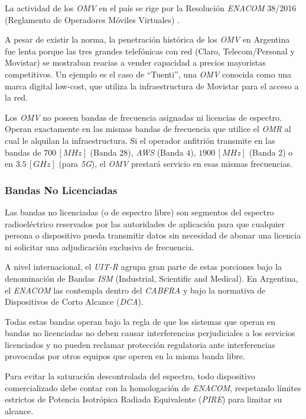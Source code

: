 \documentclass[12pt]{article}
\begin{document}
La actividad de los \textit{OMV} en el país se rige por la Resolución \textit{ENACOM} 38/2016 (Reglamento de Operadores Móviles Virtuales) \cite{b9}. 

A pesar de existir la norma, la penetración histórica de los \textit{OMV} en Argentina fue lenta porque las tres grandes telefónicas con red (Claro, Telecom/Personal y Movistar) se mostraban reacias a vender capacidad a precios mayoristas competitivos. \cite{b10} Un ejemplo es el caso de ``Tuenti'', una \textit{OMV} conocida como una marca digital low-cost, que utiliza la infraestructura de Movistar para el acceso a la red.

Los \textit{OMV} no poseen bandas de frecuencia asignadas ni licencias de espectro. Operan exactamente en las mismas bandas de frecuencia que utilice el \textit{OMR} al cual le alquilan la infraestructura. Si el operador anfitrión transmite en las bandas de $700 \, [MHz]$ (Banda $28$), \textit{AWS} (Banda $4$), $1900 \, [MHz]$ (Banda $2$) o en $3.5 \, [GHz]$ (para \textit{5G}), el \textit{OMV} prestará servicio en esas mismas frecuencias.



\subsubsection{Bandas No Licenciadas}
\label{sec_2.3.4}
Las bandas no licenciadas (o de espectro libre) son segmentos del espectro radioeléctrico reservados por las autoridades de aplicación para que cualquier persona o dispositivo pueda transmitir datos sin necesidad de abonar una licencia ni solicitar una adjudicación exclusiva de frecuencia.

A nivel internacional, el \textit{UIT-R} agrupa gran parte de estas porciones bajo la denominación de Bandas \textit{ISM} (Industrial, Scientific and Medical). En Argentina, el \textit{ENACOM} las contempla dentro del \textit{CABFRA} y bajo la normativa de Dispositivos de Corto Alcance (\textit{DCA}). 

Todas estas bandas operan bajo la regla de que los sistemas que operan en bandas no licenciadas no deben causar interferencias perjudiciales a los servicios licenciados y no pueden reclamar protección regulatoria ante interferencias provocadas por otros equipos que operen en la misma banda libre.

Para evitar la saturación descontrolada del espectro, todo dispositivo comercializado debe contar con la homologación de \textit{ENACOM}, respetando límites estrictos de Potencia Isotrópica Radiada Equivalente (\textit{PIRE}) para limitar su alcance.
\end{document}
